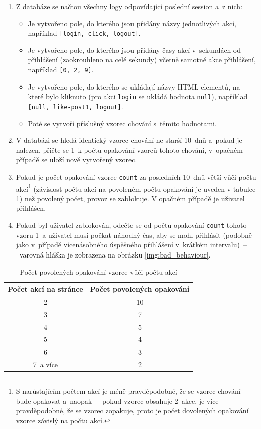 \begin{enumerate}
  \item Z databáze se načtou všechny logy odpovídající poslední session a~z nich:
  \begin{itemize}
      \item Je vytvořeno pole, do kterého jsou přidány názvy jednotlivých akcí, například \texttt{[login,~click,~logout]}.
      \item Je vytvořeno pole, do kterého jsou přidány časy akcí v~sekundách od přihlášení (zaokrouhleno na celé sekundy) včetně samotné akce přihlášení, například \texttt{[0,~2,~9]}.
      \item Je vytvořeno pole, do kterého se ukládají názvy HTML elementů, na které bylo kliknuto (pro akci \texttt{login} se ukládá hodnota \texttt{null}), například
      \\ \texttt{[null,~like-post1,~logout]}.
      \item Poté se vytvoří příslušný vzorec chování s~těmito hodnotami.
  \end{itemize}
  \item V databázi se hledá identický vzorec chování ne starší 10~dnů a~pokud je nalezen, přičte se 1~k počtu opakování vzorců tohoto chování, v~opačném případě se uloží nově vytvořený vzorec.
  \item Pokud je počet opakování vzorce \texttt{count} za posledních 10~dnů větší vůči počtu akcí\footnote{S narůstajícím počtem akcí je méně pravděpodobné, že se vzorec chování bude opakovat a~naopak~--~pokud vzorec obsahuje 2~akce, je více pravděpodobné, že se vzorec zopakuje, proto je počet dovolených opakování vzorce závislý na počtu akcí.} (závislost počtu akcí na povoleném počtu opakování je uveden v tabulce \ref{tab:allowed_num_of_repeatings}) než povolený počet, provoz se zablokuje. V opačném případě je uživatel přihlášen.
  \item Pokud byl uživatel zablokován, odečte se od počtu opakování \texttt{count} tohoto vzoru 1~a uživatel musí počkat náhodný čas, aby se mohl přihlásit (podobně jako v~případě vícenásobného úspěšného přihlášení v~krátkém intervalu)~--~varovná hláška je zobrazena na obrázku \ref{img:bad_behaviour}.
\end{enumerate}

\begin{table}[ht]
\centering
\label{tab:allowed_num_of_repeatings}
\begin{tabular}{|c|c|}
\hline
\textbf{Počet akcí na stránce} & \textbf{Počet povolených opakování} \\ \hline
2 & 10 \\
3 & 7 \\ 
4 & 5 \\ 
5 & 4 \\ 
6 & 3 \\ 
7~a více & 2 \\ \hline
\end{tabular}
\caption{Počet povolených opakování vzorce vůči počtu akcí}
\end{table}

